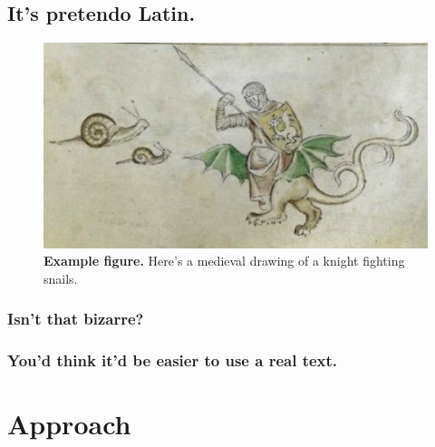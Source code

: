 \documentclass{nihgrant}
\begin{document}
\subsection*{It's pretendo Latin.} 
\lipsum[3-3]

\begin{figure}
  \vspace{-0.25cm} %
  \includegraphics[scale=0.48]{Knight-fighting-snail-470.jpg}
  \caption{
  \textbf{Example figure.}
  Here's a medieval drawing of a knight fighting snails.
}
\label{fig:example}
\vspace{-0.25cm}
\end{figure}

\subsubsection*{Isn't that bizarre?}
\lipsum[3-3]

\subsubsection*{You'd think it'd be easier to use a real text.}
\lipsum[4-4]

\section*{Approach}
\lipsum[5-5]

\pagebreak
 
\end{document}
